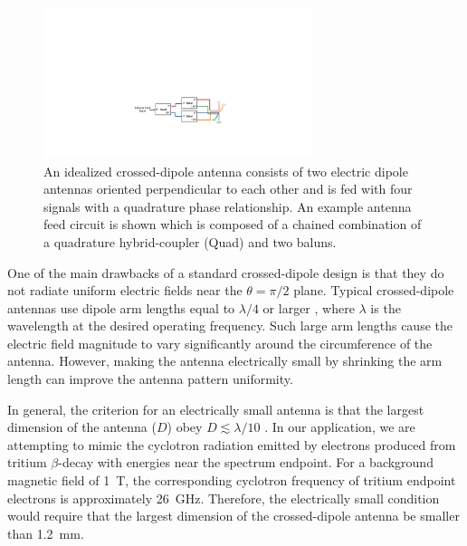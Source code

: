 \begin{figure}[h]
    \centering
    \includegraphics[width=0.7\textwidth]{figs/Chapter-5/220727_quad_balun_chain.pdf}
    \caption{\label{fig:cross-dipole} An idealized crossed-dipole antenna consists of two electric dipole antennas oriented perpendicular to each other and is fed with four signals with a quadrature phase relationship. An example antenna feed circuit is shown which is composed of a chained combination of a quadrature hybrid-coupler (Quad) and two baluns. }
\end{figure}

One of the main drawbacks of a standard crossed-dipole design is that they do not radiate uniform electric fields near the $\theta=\pi/2$ plane. Typical crossed-dipole antennas use dipole arm lengths equal to $\lambda/4$ or larger \cite{balanis2011modern}, where $\lambda$ is the wavelength at the desired operating frequency. Such large arm lengths cause the electric field magnitude to vary significantly around the circumference of the antenna. However, making the antenna electrically small by shrinking the arm length can improve the antenna pattern uniformity.

In general, the criterion for an electrically small antenna is that the largest dimension of the antenna ($D$) obey $D\lesssim\lambda/10$ \cite{balanis2015antenna}. In our application, we are attempting to mimic the cyclotron radiation emitted by electrons produced from tritium $\beta$-decay with energies near the spectrum endpoint. For a background magnetic field of 1~T, the corresponding cyclotron frequency of tritium endpoint electrons is approximately 26~GHz. Therefore, the electrically small condition would require that the largest dimension of the crossed-dipole antenna be smaller than 1.2~mm.

